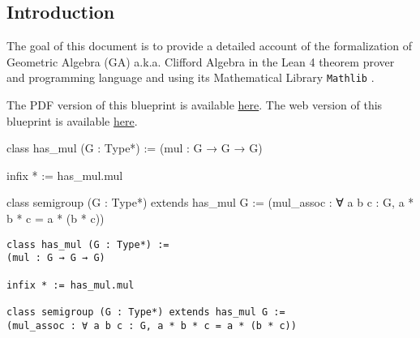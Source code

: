 \subsection*{Introduction}
\label{sec:intro}

The goal of this document is to provide a detailed account
of the formalization of Geometric Algebra (GA) a.k.a. Clifford Algebra \cite{hestenes2012clifford}
in the Lean 4 theorem prover and programming language \cite{moura2021lean, lean_2015, ullrich2023extensible}
and using its Mathematical Library \texttt{Mathlib} \cite{themathlibcommunityLeanMathematicalLibrary2020}.

\ifplastex
The PDF version of this blueprint is available \href{./blueprint.pdf}{here}.
\else
The web version of this blueprint is available \href{https://utensil.github.io/lean-ga/blueprint/}{here}.
\fi

\begin{leancode}
class has_mul (G : Type*) :=
(mul : G → G → G)

infix * := has_mul.mul
\end{leancode}
\begin{minipage}{\textwidth}  %
\vspace{-4pt}
\begin{leancode}
class semigroup (G : Type*) extends has_mul G :=
(mul_assoc : ∀ a b c : G, a * b * c = a * (b * c))
\end{leancode}
\vspace{4pt}
\end{minipage}


\begin{lstlisting}
class has_mul (G : Type*) :=
(mul : G → G → G)

infix * := has_mul.mul

class semigroup (G : Type*) extends has_mul G :=
(mul_assoc : ∀ a b c : G, a * b * c = a * (b * c))
\end{lstlisting}
